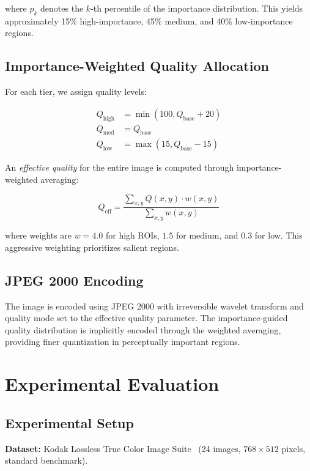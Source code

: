 \documentclass[conference]{IEEEtran}
\begin{document}
where $p_k$ denotes the $k$-th percentile of the importance distribution. This yields approximately 15\% high-importance, 45\% medium, and 40\% low-importance regions.

\subsection{Importance-Weighted Quality Allocation}

For each tier, we assign quality levels:

\begin{align}
Q_{\text{high}} &= \min(100, Q_{\text{base}} + 20) \\
Q_{\text{med}} &= Q_{\text{base}} \\
Q_{\text{low}} &= \max(15, Q_{\text{base}} - 15)
\end{align}

An \textit{effective quality} for the entire image is computed through importance-weighted averaging:

\begin{equation}
Q_{\text{eff}} = \frac{\sum_{x,y} Q(x,y) \cdot w(x,y)}{\sum_{x,y} w(x,y)}
\end{equation}

where weights are $w = 4.0$ for high ROIs, $1.5$ for medium, and $0.3$ for low. This aggressive weighting prioritizes salient regions.

\subsection{JPEG 2000 Encoding}

The image is encoded using JPEG 2000 with irreversible wavelet transform and quality mode set to the effective quality parameter. The importance-guided quality distribution is implicitly encoded through the weighted averaging, providing finer quantization in perceptually important regions.

\section{Experimental Evaluation}

\subsection{Experimental Setup}

\textbf{Dataset:} Kodak Lossless True Color Image Suite~\cite{kodak} (24 images, $768 \times 512$ pixels, standard benchmark).
\end{document}
